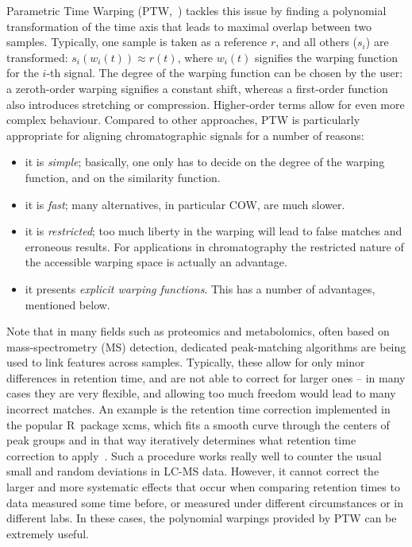 \documentclass[a4paper,11pt]{article}\usepackage[]{graphicx}\usepackage[]{color}
\newcommand{\pkg}[1]{{\normalfont\fontseries{b}\selectfont #1}}
\newcommand{\proglang}[1]{{\sffamily #1}}
\newcommand{\R}{\proglang{R}}
\begin{document}
Parametric Time Warping (PTW,~\citet{Eilers2004}) tackles this issue by
finding a polynomial transformation of the time axis that leads to
maximal overlap between two samples. Typically, one sample is taken as
a reference $r$, and all others ($s_i$) are transformed: 
$s_i(w_i(t)) \approx r(t)$, where $w_i(t)$ signifies the warping
function for the $i$-th signal. The degree of the warping function can
be chosen by the 
user: a zeroth-order warping signifies a constant shift, whereas a
first-order function also introduces stretching or
compression. Higher-order terms allow for even more complex behaviour.
Compared to other approaches, PTW is particularly appropriate for
aligning chromatographic signals for a number of reasons: 
\begin{itemize}
\item it is \emph{simple}; basically, one only has to decide on the
  degree of the warping function, and on the similarity function.
\item it is \emph{fast}; many alternatives, in particular COW, are
  much slower.
\item it is \emph{restricted}; too much liberty in the warping will lead to
  false matches and erroneous results. For applications in
  chromatography the restricted nature of the accessible warping space
  is actually an advantage.
\item it presents \emph{explicit warping functions}. This has a number
  of advantages, mentioned below.
\end{itemize}
Note that in many fields such as
proteomics and metabolomics, often based on mass-spectrometry (MS)
detection, dedicated peak-matching algorithms are
being used to link features across samples. Typically, these allow for
only minor differences in retention time, and are not able to correct
for larger ones -- in many cases they are very flexible, and allowing
too much freedom would lead to many incorrect matches. An example is
the retention time correction implemented in the popular \R\ package
\pkg{xcms}, which fits a smooth curve through the centers of peak
groups and in that way iteratively determines what retention time
correction to apply~\citep{Smith2006}. Such a procedure works really
well to counter the usual small and random deviations in LC-MS
data. However, it cannot correct the larger and more systematic
effects that occur when comparing retention times to data measured
some time before, or measured under different circumstances or in
different labs. In these cases, the polynomial warpings provided by
PTW can be extremely useful. 
\end{document}
